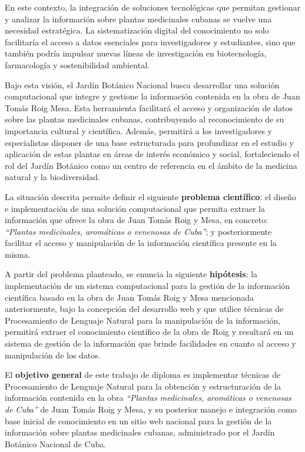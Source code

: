 En este contexto, la integración de soluciones tecnológicas que permitan gestionar y 
analizar la información sobre plantas medicinales cubanas se vuelve una necesidad estratégica. 
La sistematización digital del conocimiento no solo facilitaría el acceso a datos esenciales 
para investigadores y estudiantes, sino que también podría impulsar nuevas líneas de 
investigación en biotecnología, farmacología y sostenibilidad ambiental.

Bajo esta visión, el Jardín Botánico Nacional busca desarrollar una solución computacional 
que integre y gestione la información contenida en la obra de Juan Tomás Roig Mesa. 
Esta herramienta facilitará el acceso y organización de datos sobre las plantas medicinales 
cubanas, contribuyendo al reconocimiento de su importancia cultural y científica. 
Además, permitirá a los investigadores y especialistas disponer de una base estructurada 
para profundizar en el estudio y aplicación de estas plantas en áreas de interés 
económico y social, fortaleciendo el rol del Jardín Botánico como un centro 
de referencia en el ámbito de la medicina natural y la biodiversidad.

La situación descrita permite definir el siguiente \textbf{problema científico}: 
el diseño e implementación de una solución computacional que permita extraer 
la información que ofrece la obra de Juan Tomás Roig y Mesa, en concreto: 
\textit{``Plantas medicinales, aromáticas o venenosas de Cuba''}; y posteriormente 
facilitar el acceso y manipulación de la información científica presente en la misma. 

A partir del problema planteado, se enuncia la siguiente \textbf{hipótesis}: 
la implementación de un sistema computacional para la gestión de la información 
científica basado en la obra de Juan Tomás Roig y Mesa mencionada anteriormente, 
bajo la concepción del desarrollo web y que utilice técnicas de Procesamiento de 
Lenguaje Natural para la manipulación de la información, permitirá extraer el 
conocimiento científico de la obra de Roig y resultará en un sistema de gestión de 
la información que brinde facilidades en cuanto al acceso y manipulación de los datos. 

El \textbf{objetivo general} de este trabajo de diploma es implementar técnicas 
de Procesamiento de Lenguaje Natural para la obtención y estructuración de la información 
contenida en la obra \textit{``Plantas medicinales, aromáticas o venenosas de Cuba''} de 
Juan Tomás Roig y Mesa, y su posterior manejo e integración como base inicial de conocimiento 
en un sitio web nacional para la gestión de la información sobre plantas medicinales cubanas, 
administrado por el Jardín Botánico Nacional de Cuba.

